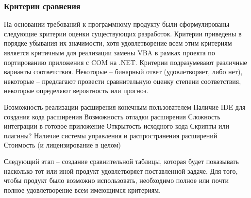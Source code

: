 
\subsubsection{Критерии сравнения}
На основании требований к программному продукту были сформулированы следующие критерии оценки существующих разработок. Критерии приведены в порядке убывания их значимости, хотя удовлетворение всем этим критериям является критичным для реализации замены VBA в рамках проекта по портированию приложения с COM на .NET. Критерии подразумевают различные варианты соответствия. Некоторые – бинарный ответ (удовлетворяет, либо нет), некоторые – предлагают провести сравнительную оценку степени соответствия, некоторые определяют вероятность или прогноз.

Возможность реализации расширения конечным пользователем
Наличие IDE для создания кода расширения
Возможность отладки расширения
Сложность интеграции в готовое приложение
Открытость исходного кода
Скрипты или плагины?
Наличие системы управления и распространения расширений
Стоимость (и лицензирование в целом)

Следующий этап – создание сравнительной таблицы, которая будет показывать насколько тот или иной продукт удовлетворяет поставленной задаче. Для того, чтобы продукт было возможно использовать, необходимо полное или почти полное удовлетворение всем имеющимся критериям.

\pagebreak